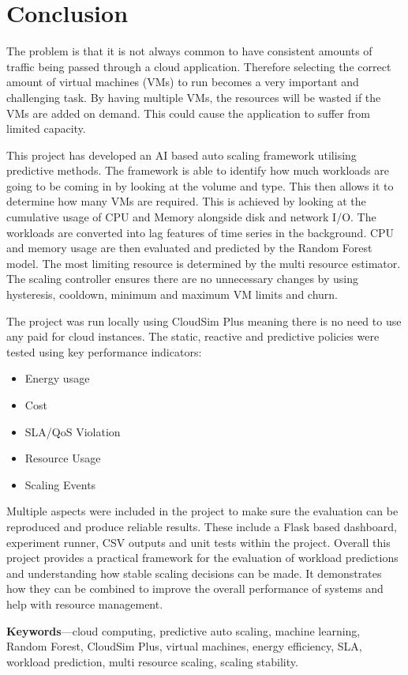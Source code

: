 \documentclass[10pt,journal,compsoc]{IEEEtran}
\begin{document}
\section{Conclusion}
The problem is that it is not always common to have consistent amounts of traffic being passed through a cloud application. Therefore selecting the correct amount of virtual machines (VMs) to run becomes a very important and challenging task. By having multiple VMs, the resources will be wasted if the VMs are added on demand. This could cause the application to suffer from limited capacity.

This project has developed an AI based auto scaling framework utilising predictive methods. The framework is able to identify how much workloads are going to be coming in by looking at the volume and type. This then allows it to determine how many VMs are required. This is achieved by looking at the cumulative usage of CPU and Memory alongside disk and network I/O. The workloads are converted into lag features of time series in the background. CPU and memory usage are then evaluated and predicted by the Random Forest model. The most limiting resource is determined by the multi resource estimator. The scaling controller ensures there are no unnecessary changes by using hysteresis, cooldown, minimum and maximum VM limits and churn.

The project was run locally using CloudSim Plus meaning there is no need to use any paid for cloud instances. The static, reactive and predictive policies were tested using key performance indicators:
\begin{itemize}
    \item Energy usage
    \item Cost
    \item SLA/QoS Violation
    \item Resource Usage
    \item Scaling Events
\end{itemize}

Multiple aspects were included in the project to make sure the evaluation can be reproduced and produce reliable results. These include a Flask based dashboard, experiment runner, CSV outputs and unit tests within the project. Overall this project provides a practical framework for the evaluation of workload predictions and understanding how stable scaling decisions can be made. It demonstrates how they can be combined to improve the overall performance of systems and help with resource management.

\vspace{0.3cm}
\noindent \textbf{Keywords}---cloud computing, predictive auto scaling, machine learning, Random Forest, CloudSim Plus, virtual machines, energy efficiency, SLA, workload prediction, multi resource scaling, scaling stability.
\end{document}

